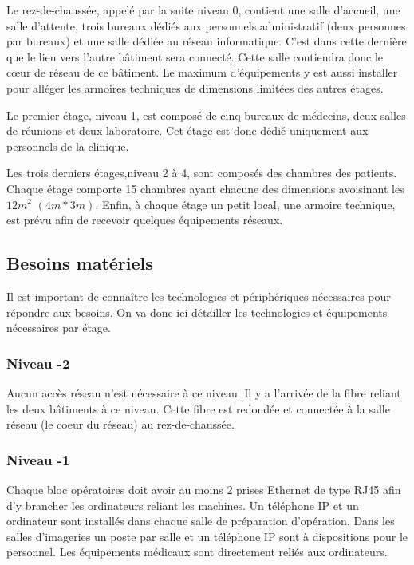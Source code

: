 Le rez-de-chaussée, appelé par la suite niveau 0, contient une salle d'accueil, une salle d'attente, trois bureaux dédiés aux personnels administratif (deux personnes par bureaux) et une salle dédiée au réseau informatique.
C'est dans cette dernière que le lien vers l'autre bâtiment sera connecté.
Cette salle contiendra donc le cœur de réseau de ce bâtiment.
Le maximum d'équipements y est aussi installer pour alléger les armoires techniques de dimensions limitées des autres étages.

Le premier étage, niveau 1, est composé de cinq bureaux de médecins, deux salles de réunions et deux laboratoire.
Cet étage est donc dédié uniquement aux personnels de la clinique.

Les trois derniers étages,niveau 2 à 4, sont composés des chambres des patients.
Chaque étage comporte 15 chambres ayant chacune des dimensions avoisinant les $12m^{2}$ $(4m * 3m)$.
Enfin, à chaque étage un petit local, une armoire technique, est prévu afin de recevoir quelques équipements réseaux.


%
    \cleardoublepage
%
%
\subsection{Besoins matériels}

Il est important de connaître les technologies et périphériques nécessaires pour répondre aux besoins.
On va donc ici détailler les technologies et équipements nécessaires par étage.

\subsubsection{Niveau -2}
Aucun accès réseau n'est nécessaire à ce niveau.
Il y a l'arrivée de la fibre reliant les deux bâtiments à ce niveau.
Cette fibre est redondée et connectée à la salle réseau (le coeur du réseau) au rez-de-chaussée.

\subsubsection{Niveau -1}
Chaque bloc opératoires doit avoir au moins 2 prises Ethernet de type RJ45 afin d'y brancher les ordinateurs reliant les machines.
Un téléphone IP et un ordinateur sont installés dans chaque salle de préparation d'opération.
Dans les salles d'imageries un poste par salle et un téléphone IP sont à dispositions pour le personnel.
Les équipements médicaux sont directement reliés aux ordinateurs.

